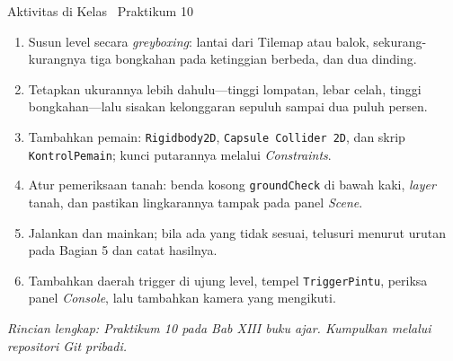 \documentclass[aspectratio=169,10pt]{beamer}
\begin{document}
\begin{frame}{Aktivitas di Kelas \textperiodcentered\ Praktikum 10}
\begin{enumerate}
  \item Susun level secara \emph{greyboxing}: lantai dari Tilemap atau balok,
        sekurang-kurangnya tiga bongkahan pada ketinggian berbeda, dan dua
        dinding.
  \item Tetapkan ukurannya lebih dahulu---tinggi lompatan, lebar celah, tinggi
        bongkahan---lalu sisakan kelonggaran sepuluh sampai dua puluh persen.
  \item Tambahkan pemain: \texttt{Rigidbody2D}, \texttt{Capsule Collider 2D},
        dan skrip \texttt{KontrolPemain}; kunci putarannya melalui
        \emph{Constraints}.
  \item Atur pemeriksaan tanah: benda kosong \texttt{groundCheck} di bawah kaki,
        \emph{layer} tanah, dan pastikan lingkarannya tampak pada panel
        \emph{Scene}.
  \item Jalankan dan mainkan; bila ada yang tidak sesuai, telusuri menurut
        urutan pada Bagian 5 dan catat hasilnya.
  \item Tambahkan daerah trigger di ujung level, tempel \texttt{TriggerPintu},
        periksa panel \emph{Console}, lalu tambahkan kamera yang mengikuti.
\end{enumerate}
\vspace{0.08cm}
{\footnotesize\color{ubAccent}\itshape Rincian lengkap: Praktikum 10 pada
Bab XIII buku ajar. Kumpulkan melalui repositori Git pribadi.}
\end{frame}
\end{document}
